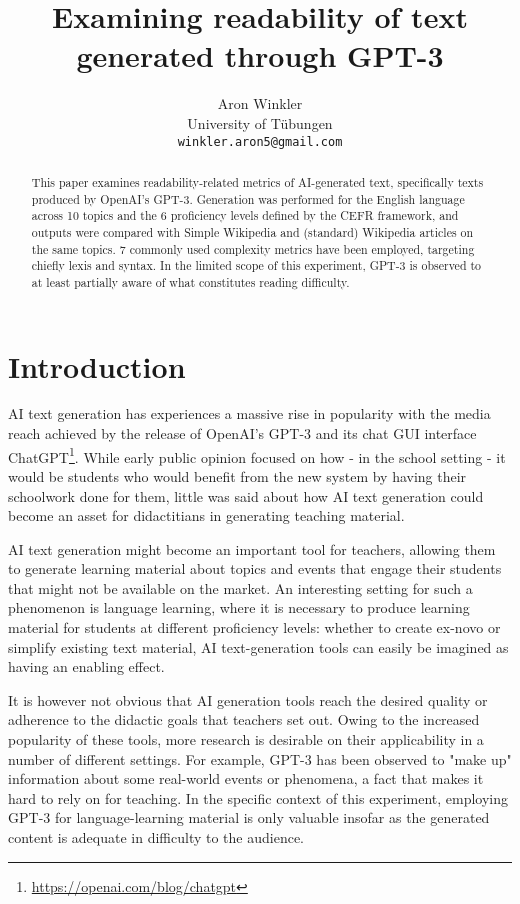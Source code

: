 \documentclass[11pt]{article}
\title{Examining readability of text generated through GPT-3 }
\author{Aron Winkler \\
  University of Tübungen \\
  \texttt{winkler.aron5@gmail.com}}
\begin{document}
\maketitle
\begin{abstract}
    This paper examines readability-related metrics of AI-generated text, specifically texts produced by OpenAI's GPT-3. Generation was performed for the English language across 10 topics and the 6 proficiency levels defined by the CEFR framework, and outputs were compared with Simple Wikipedia and (standard) Wikipedia articles on the same topics. 7 commonly used complexity metrics have been employed, targeting chiefly lexis and syntax. In the limited scope of this experiment, GPT-3 is observed to at least partially aware of what constitutes reading difficulty.
\end{abstract}

\section{Introduction}

AI text generation has experiences a massive rise in popularity with the media reach achieved by the release of OpenAI's GPT-3 \citep{brown2020language} and its chat GUI interface ChatGPT\footnote{\url{https://openai.com/blog/chatgpt}}. While early public opinion focused on how - in the school setting - it would be students who would benefit from the new system by having their schoolwork done for them, little was said about how AI text generation could become an asset for didactitians in generating teaching material.

AI text generation might become an important tool for teachers, allowing them to generate learning material about topics and events that engage their students that might not be available on the market. An interesting setting for such a phenomenon is language learning, where it is necessary to produce learning material for students at different proficiency levels: whether to create ex-novo or simplify existing text material, AI text-generation tools can easily be imagined as having an enabling effect. 

It is however not obvious that AI generation tools reach the desired quality or adherence to the didactic goals that teachers set out. Owing to the increased popularity of these tools, more research is desirable on their applicability in a number of different settings. For example, GPT-3 has been observed to "make up" information about some real-world events or phenomena, a fact that makes it hard to rely on for teaching. In the specific context of this experiment, employing GPT-3 for language-learning material is only valuable insofar as the generated content is adequate in difficulty to the audience.
\end{document}
